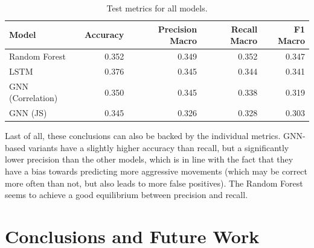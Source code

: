 \documentclass{article}
\begin{document}
\begin{table}
    \centering
    \begin{tabular}{lrrrr}
        \toprule
        Model             & Accuracy & Precision Macro & Recall Macro & F1 Macro \\
        \midrule
        Random Forest     & 0.352    & 0.349           & 0.352        & 0.347    \\
        LSTM              & 0.376    & 0.345           & 0.344        & 0.341    \\
        GNN (Correlation) & 0.350    & 0.345           & 0.338        & 0.319    \\
        GNN (JS)          & 0.345    & 0.326           & 0.328        & 0.303    \\
        \bottomrule
    \end{tabular}
    \vspace{0.5em}
    \caption{Test metrics for all models.}
    \label{tab:test_metrics}
\end{table}

Last of all, these conclusions can also be backed by the individual metrics. GNN-based variants have a slightly higher accuracy than recall, but a significantly lower precision than the other models, which is in line with the fact that they have a bias towards predicting more aggressive movements (which may be correct more often than not, but also leads to more false positives). The Random Forest seems to achieve a good equilibrium between precision and recall.

\section{Conclusions and Future Work}


\end{document}
